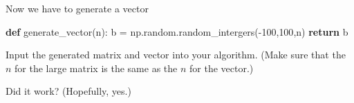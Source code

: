 \documentclass{article}
\newenvironment{Shaded}{}{}
\newcommand{\KeywordTok}[1]{\textcolor[rgb]{0.00,0.44,0.13}{\textbf{{#1}}}}
\newcommand{\DecValTok}[1]{\textcolor[rgb]{0.25,0.63,0.44}{{#1}}}
\newcommand{\NormalTok}[1]{{#1}}
\begin{document}
Now we have to generate a vector

\begin{Shaded}
\begin{Highlighting}[]
\KeywordTok{def} \NormalTok{generate_vector(n):}
    \NormalTok{b = np.random.random_intergers(-}\DecValTok{100}\NormalTok{,}\DecValTok{100}\NormalTok{,n)}
    \KeywordTok{return} \NormalTok{b}
\end{Highlighting}
\end{Shaded}

Input the generated matrix and vector into your algorithm. (Make sure
that the $n$ for the large matrix is the same as the $n$ for the
vector.)

Did it work? (Hopefully, yes.)


    
    
    
    
\end{document}
